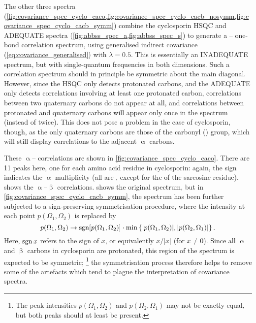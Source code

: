 The other three spectra (\cref{fig:covariance_spec_cyclo_caco,fig:covariance_spec_cyclo_cacb_nosymm,fig:covariance_spec_cyclo_cacb_symm}) combine the cyclosporin \carbon{} HSQC and ADEQUATE spectra (\cref{fig:abbss_spec_a,fig:abbss_spec_s}) to generate a \carbon{}--\carbon{} one-bond correlation spectrum, using generalised indirect covariance (\cref{eq:covariance_generalised}) with $\lambda = 0.5$.
This is essentially an INADEQUATE spectrum, but with single-quantum frequencies in both dimensions\autocite{Martin2011MRC,Martin2011MRC2}.
Such a correlation spectrum should in principle be symmetric about the main diagonal.
However, since the HSQC only detects protonated carbons, and the ADEQUATE only detects correlations involving at least one protonated carbon,
correlations between two quaternary carbons do not appear at all, and correlations between protonated and quaternary carbons will appear only once in the spectrum (instead of twice).
This does not pose a problem in the case of cyclosporin, though, as the only quaternary carbons are those of the carbonyl () group, which will still display correlations to the adjacent $\upalpha$ carbons.

These $\upalpha$-- correlations are shown in \cref{fig:covariance_spec_cyclo_caco}.
There are 11 peaks here, one for each amino acid residue in cyclosporin: again, the sign indicates the $\upalpha$ multiplicity (all are , except for the  of the sarcosine residue).
 shows the $\upalpha$--$\upbeta$ correlations.
 shows the original spectrum, but in \cref{fig:covariance_spec_cyclo_cacb_symm}, the spectrum has been further subjected to a sign-preserving symmetrisation procedure, where the intensity at each point $p(\Omega_1, \Omega_2)$ is replaced by
\begin{equation}
    \label{eq:covariance_symmetrisation}
    p(\Omega_1, \Omega_2) \to \operatorname*{sgn}[p(\Omega_1, \Omega_2)] \cdot \min\left\{\lvert p(\Omega_1, \Omega_2)\rvert, \lvert p(\Omega_2, \Omega_1)\rvert \right\}.
\end{equation}
Here, $\operatorname*{sgn}{x}$ refers to the sign of $x$, or equivalently $x / |x|$ (for $x \neq 0$).
Since all $\upalpha$ and $\upbeta$ carbons in cyclosporin are protonated, this region of the spectrum is expected to be symmetric;%
\footnote{The peak intensities $p(\Omega_1, \Omega_2)$ and $p(\Omega_2, \Omega_1)$ may not be exactly equal, but both peaks should at least be present.}
the symmetrisation process therefore helps to remove some of the artefacts which tend to plague the interpretation of covariance spectra.

